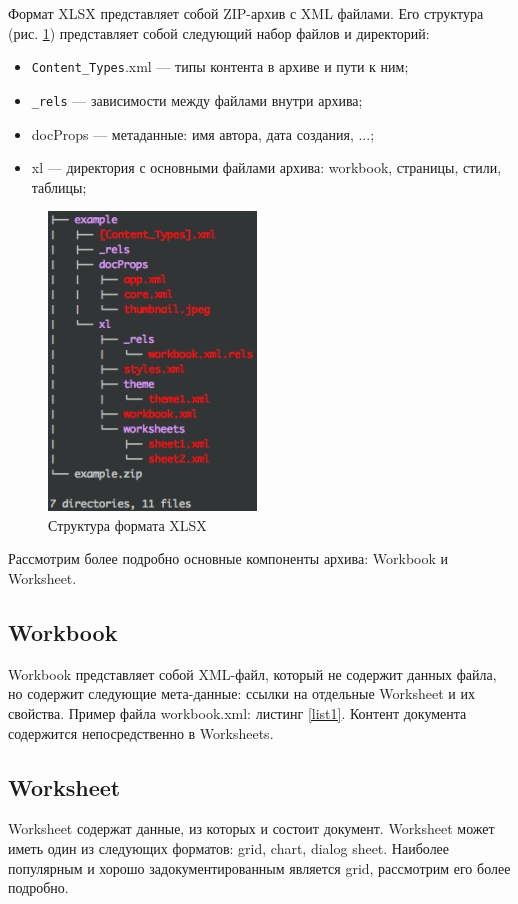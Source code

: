 \documentclass[14pt]{matmex-diploma}
\begin{document}
Формат XLSX представляет собой ZIP-архив с XML файлами. Его структура (рис. \ref{xlsx_tree}) представляет собой следующий набор файлов и директорий:
\begin{itemize}
    \item \texttt{Content\_Types}.xml --- типы контента в архиве и пути к ним;
    \item \texttt{\_rels} --- зависимости между файлами внутри архива;
    \item docProps --- метаданные: имя автора, дата создания, ...;
    \item xl --- директория с основными файлами архива: workbook, страницы, стили, таблицы;
\end{itemize}

\begin{figure}
     \centering
     \includegraphics{xlsx_tree.png}
     \caption{Структура формата XLSX}\label{xlsx_tree}
\end{figure}

Рассмотрим более подробно основные компоненты архива: Workbook и Worksheet.
\subsection{Workbook}
Workbook представляет собой XML-файл, который не содержит данных файла, но содержит следующие мета-данные: ссылки на отдельные Worksheet и их свойства. Пример файла workbook.xml: листинг \ref{list1}. Контент документа содержится непосредственно в Worksheets.
\subsection{Worksheet}
Worksheet содержат данные, из которых и состоит документ. Worksheet может иметь один из следующих форматов: grid, chart, dialog sheet. Наиболее популярным и хорошо задокументированным является grid, рассмотрим его более подробно. 
\end{document}

